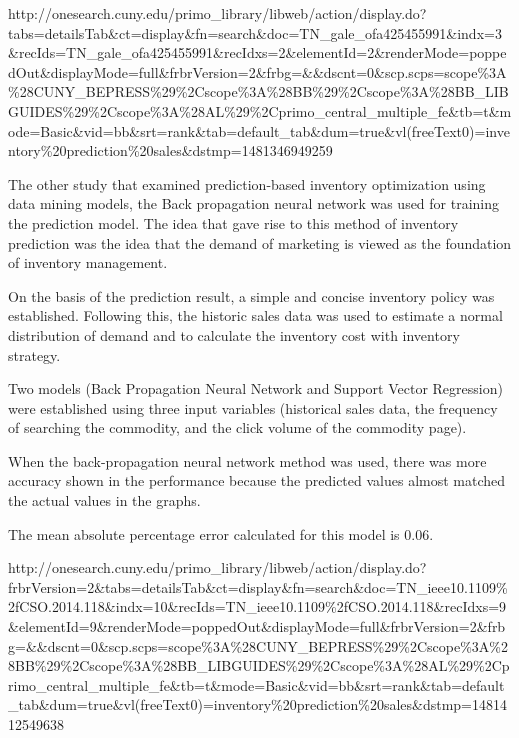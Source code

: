 \documentclass[]{elsarticle} %
\begin{document}
http://onesearch.cuny.edu/primo\_library/libweb/action/display.do?tabs=detailsTab\&ct=display\&fn=search\&doc=TN\_gale\_ofa425455991\&indx=3\&recIds=TN\_gale\_ofa425455991\&recIdxs=2\&elementId=2\&renderMode=poppedOut\&displayMode=full\&frbrVersion=2\&frbg=\&\&dscnt=0\&scp.scps=scope\%3A\%28CUNY\_BEPRESS\%29\%2Cscope\%3A\%28BB\%29\%2Cscope\%3A\%28BB\_LIBGUIDES\%29\%2Cscope\%3A\%28AL\%29\%2Cprimo\_central\_multiple\_fe\&tb=t\&mode=Basic\&vid=bb\&srt=rank\&tab=default\_tab\&dum=true\&vl(freeText0)=inventory\%20prediction\%20sales\&dstmp=1481346949259

The other study that examined prediction-based inventory optimization
using data mining models, the Back propagation neural network was used
for training the prediction model. The idea that gave rise to this
method of inventory prediction was the idea that the demand of marketing
is viewed as the foundation of inventory management.

On the basis of the prediction result, a simple and concise inventory
policy was established. Following this, the historic sales data was used
to estimate a normal distribution of demand and to calculate the
inventory cost with inventory strategy.

Two models (Back Propagation Neural Network and Support Vector
Regression) were established using three input variables (historical
sales data, the frequency of searching the commodity, and the click
volume of the commodity page).

When the back-propagation neural network method was used, there was more
accuracy shown in the performance because the predicted values almost
matched the actual values in the graphs.

The mean absolute percentage error calculated for this model is 0.06.

http://onesearch.cuny.edu/primo\_library/libweb/action/display.do?frbrVersion=2\&tabs=detailsTab\&ct=display\&fn=search\&doc=TN\_ieee10.1109\%2fCSO.2014.118\&indx=10\&recIds=TN\_ieee10.1109\%2fCSO.2014.118\&recIdxs=9\&elementId=9\&renderMode=poppedOut\&displayMode=full\&frbrVersion=2\&frbg=\&\&dscnt=0\&scp.scps=scope\%3A\%28CUNY\_BEPRESS\%29\%2Cscope\%3A\%28BB\%29\%2Cscope\%3A\%28BB\_LIBGUIDES\%29\%2Cscope\%3A\%28AL\%29\%2Cprimo\_central\_multiple\_fe\&tb=t\&mode=Basic\&vid=bb\&srt=rank\&tab=default\_tab\&dum=true\&vl(freeText0)=inventory\%20prediction\%20sales\&dstmp=1481412549638
\end{document}
